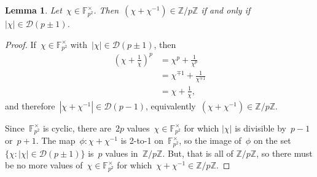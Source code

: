 \documentclass{article}
\newtheorem{lemma}{Lemma}
\theoremstyle{definition}
\theoremstyle{remark}
\begin{document}
\begin{lemma}\label{lem:order-divides}
    Let~$\chi \in \mathbb{F}_{p^2}^\times$.
    Then~$(\chi + \chi^{-1}) \in \mathbb{Z} / p\mathbb{Z}$ if and only if~$|\chi| \in \mathcal{D}(p \pm 1)$.
\end{lemma}
\begin{proof}
    If~$\chi \in \mathbb{F}_{p^2}^\times$ with~$|\chi| \in \mathcal{D}(p \pm 1)$, then
    \begin{align*}
        {\left(\chi + \frac{1}{\chi}\right)}^p &= \chi^p + \frac{1}{\chi^p} \\
                                             &= \chi^{\mp 1} + \frac{1}{\chi^{\mp 1}} \\
                                             &= \chi + \frac{1}{\chi},
    \end{align*}
    and therefore~$|\chi + \chi^{-1}| \in \mathcal{D}(p - 1)$, equivalently~$(\chi + \chi^{-1}) \in \mathbb{Z} / p\mathbb{Z}$.

    Since~$\mathbb{F}_{p^2}^\times$ is cyclic, there are~$2p$ values~$\chi \in \mathbb{F}_{p^2}^\times$ for which $|\chi|$ is divisible by~$p - 1$ or~$p + 1$.
    The map~$\phi : \chi + \chi^{-1}$ is 2-to-1 on~$\mathbb{F}_{p^2}^\times$, so the image of~$\phi$ on the set~$\{\chi : |\chi| \in \mathcal{D}(p \pm 1)\}$ is~$p$ values in~$\mathbb{Z} / p\mathbb{Z}$.
    But, that is all of $\mathbb{Z} / p\mathbb{Z}$, so there must be no more values of~$\chi \in \mathbb{F}_{p^2}^\times$ for which~$\chi + \chi^{-1} \in \mathbb{Z} / p\mathbb{Z}$.
\end{proof}
\end{document}
